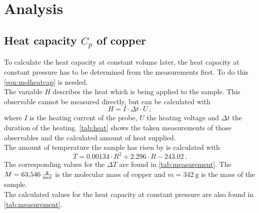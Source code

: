 \chapter{Analysis}
\label{cha:analysis}

\section{Heat capacity $C_p$ of copper}

To calculate the heat capacity at constant volume later, the heat capacity at constant pressure has to be determined from
the measurements first. To do this \autoref{eqn:molheatcap} is needed. \\
The variable $H$ describes the heat which is being applied to the sample. This observable cannot be measured directly, but can
be calculated with 
\begin{equation}
    H = I \cdot \Delta t \cdot U \, ,
\end{equation}
where $I$ is the heating current of the probe, $U$ the heating voltage and $\Delta t$ the duration of the heating. \autoref{tab:heat} shows
the taken measurements of those observables and the calculated amount of heat supplied.\\
The amount of temperature the sample has risen by is calculated with
\begin{equation}
    \label{eq:resistance}
    T = 0.00134⋅R^2+2.296⋅R-243.02 \, .
\end{equation}
The corresponding values for the $\Delta T$ are found in \autoref{tab:measurement}. The $M = \qty{63.546}{\frac{\gram}{\mol}}$ \cite{copper} is the molecular mass of copper
and $m = \qty{342}{\gram}$\cite{v47} is the mass of the sample.\\
The calculated values for the heat capacity at constant pressure are also found in \autoref{tab:measurement}.

